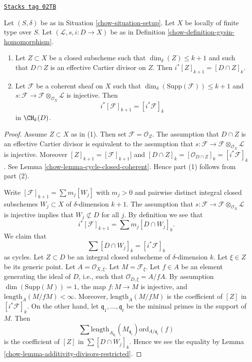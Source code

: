 \begin{lemma}
\label{chow-lemma-easy-gysin}
\href{https://stacks.math.columbia.edu/tag/02TB}{\texttt{Stacks tag 02TB}}

Let $(S, \delta)$ be as in Situation \ref{chow-situation-setup}.
Let $X$ be locally of finite type over $S$.
Let $(\mathcal{L}, s, i : D \to X)$ be as in
Definition \ref{chow-definition-gysin-homomorphism}.
\begin{enumerate}
\item Let $Z \subset X$ be a closed subscheme such
that $\dim_\delta(Z) \leq k + 1$ and such that
$D \cap Z$ is an effective Cartier divisor on $Z$. Then
$i^*[Z]_{k + 1} = [D \cap Z]_k$.
\item Let $\mathcal{F}$ be a coherent sheaf on $X$
such that $\dim_\delta(\text{Supp}(\mathcal{F})) \leq k + 1$ and
$s : \mathcal{F} \to \mathcal{F} \otimes_{\mathcal{O}_X} \mathcal{L}$
is injective. Then
$$
i^*[\mathcal{F}]_{k + 1} = [i^*\mathcal{F}]_k
$$
in $\CH_k(D)$.
\end{enumerate}
\end{lemma}

\begin{proof}

Assume $Z \subset X$ as in (1). Then set $\mathcal{F} = \mathcal{O}_Z$.
The assumption that $D \cap Z$ is an effective Cartier divisor is
equivalent to the assumption that
$s : \mathcal{F} \to \mathcal{F} \otimes_{\mathcal{O}_X} \mathcal{L}$
is injective. Moreover $[Z]_{k + 1} = [\mathcal{F}]_{k + 1}]$
and $[D \cap Z]_k = [\mathcal{O}_{D \cap Z}]_k = [i^*\mathcal{F}]_k$.
See Lemma \ref{chow-lemma-cycle-closed-coherent}.
Hence part (1) follows from part (2).

\medskip\noindent
Write $[\mathcal{F}]_{k + 1} = \sum m_j[W_j]$ with $m_j > 0$
and pairwise distinct integral closed subschemes $W_j \subset X$
of $\delta$-dimension $k + 1$. The assumption that
$s : \mathcal{F} \to \mathcal{F} \otimes_{\mathcal{O}_X} \mathcal{L}$
is injective implies that $W_j \not \subset D$ for all $j$.
By definition we see that
$$
i^*[\mathcal{F}]_{k + 1} = \sum m_j [D \cap W_j]_k.
$$
We claim that
$$
\sum [D \cap W_j]_k = [i^*\mathcal{F}]_k
$$
as cycles.
Let $Z \subset D$ be an integral closed subscheme of $\delta$-dimension
$k$. Let $\xi \in Z$ be its generic point. Let $A = \mathcal{O}_{X, \xi}$.
Let $M = \mathcal{F}_\xi$. Let $f \in A$ be an element generating the
ideal of $D$, i.e., such that $\mathcal{O}_{D, \xi} = A/fA$.
By assumption $\dim(\text{Supp}(M)) = 1$,
the map $f : M \to M$ is injective, and
$\text{length}_A(M/fM) < \infty$. Moreover, $\text{length}_A(M/fM)$
is the coefficient of $[Z]$ in $[i^*\mathcal{F}]_k$. On the
other hand, let $\mathfrak q_1, \ldots, \mathfrak q_t$ be the minimal
primes in the support of $M$. Then
$$
\sum
\text{length}_{A_{\mathfrak q_i}}(M_{\mathfrak q_i})
\text{ord}_{A/\mathfrak q_i}(f)
$$
is the coefficient of $[Z]$ in $\sum [D \cap W_j]_k$.
Hence we see the equality by
Lemma \ref{chow-lemma-additivity-divisors-restricted}.
\end{proof}

